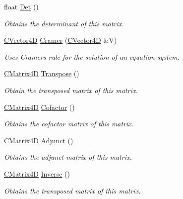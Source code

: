 \begin{DoxyCompactItemize}
\item 
float \hyperlink{struct_c_matrix4_d_ac70341a7aa1ab9245e0619e1a808a5dd}{Det} ()
\begin{DoxyCompactList}\small\item\em Obtains the determinant of this matrix. \end{DoxyCompactList}\item 
\hyperlink{struct_c_vector4_d}{C\+Vector4D} \hyperlink{struct_c_matrix4_d_a5892af1d0feb465cd69084826e2734ce}{Cramer} (\hyperlink{struct_c_vector4_d}{C\+Vector4D} \&V)
\begin{DoxyCompactList}\small\item\em Uses Cramer\textquotesingle{}s rule for the solution of an equation system. \end{DoxyCompactList}\item 
\hyperlink{struct_c_matrix4_d}{C\+Matrix4D} \hyperlink{struct_c_matrix4_d_ad1d96ed5ff11c4bce0bd720dd22479ee}{Transpose} ()
\begin{DoxyCompactList}\small\item\em Obtain the transposed matrix of this matrix. \end{DoxyCompactList}\item 
\hyperlink{struct_c_matrix4_d}{C\+Matrix4D} \hyperlink{struct_c_matrix4_d_af02075b9d6c2624a6000ea88bd927a88}{Cofactor} ()
\begin{DoxyCompactList}\small\item\em Obtains the cofactor matrix of this matrix. \end{DoxyCompactList}\item 
\hyperlink{struct_c_matrix4_d}{C\+Matrix4D} \hyperlink{struct_c_matrix4_d_aa9c5a92e19a304a60437ffc1c3bcafe7}{Adjunct} ()
\begin{DoxyCompactList}\small\item\em Obtains the adjunct matrix of this matrix. \end{DoxyCompactList}\item 
\hyperlink{struct_c_matrix4_d}{C\+Matrix4D} \hyperlink{struct_c_matrix4_d_a2c9c0311057eb2aba291aec801c8d7d6}{Inverse} ()
\begin{DoxyCompactList}\small\item\em Obtains the transposed matrix of this matrix. \end{DoxyCompactList}\end{DoxyCompactItemize}
